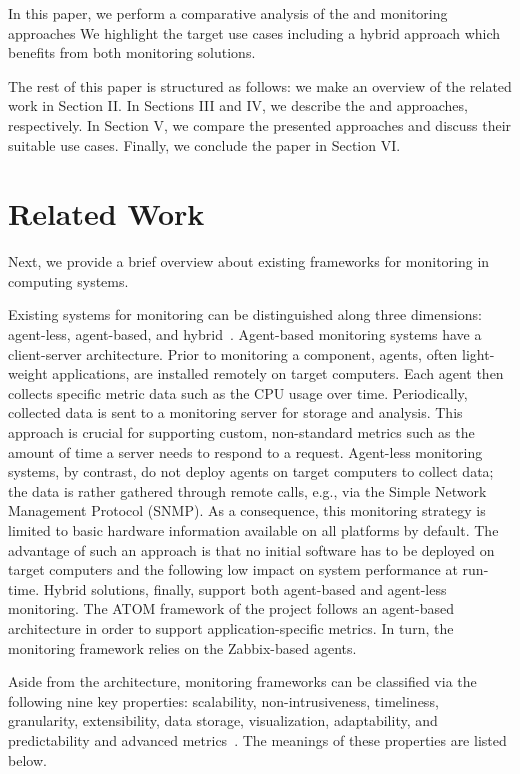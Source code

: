 \documentclass[10pt,letterpaper]{IEEEtran}
\begin{document}
In this paper, we perform a comparative analysis of the \ECO and \EXCESS monitoring approaches
We highlight the target use cases including a hybrid approach which benefits from both monitoring solutions.

The rest of this paper is structured as follows: we make an overview of the related work in Section II.
In Sections III and IV, we describe the \ECO and \EXCESS approaches, respectively.
In Section V, we compare the presented approaches and discuss their suitable use cases. Finally, we conclude the paper in Section VI.

\section{Related Work}
\label{sec:rw}

\noindent
Next, we provide a brief overview about existing frameworks for monitoring in computing systems.

Existing systems for monitoring can be distinguished along three dimensions: agent-less, agent-based, and hybrid~\cite{uptime14}.
Agent-based monitoring systems have a client-server architecture. Prior to monitoring a component, agents,
often light-weight applications, are installed remotely on target computers. Each agent then collects specific metric data
such as the CPU usage over time. Periodically, collected data is sent to a monitoring server for storage and analysis.
This approach is crucial for supporting custom, non-standard metrics such as the amount of time a server needs
to respond to a request. Agent-less monitoring systems, by contrast, do not deploy agents on target computers to collect
data; the data is rather gathered through remote calls, e.g., via the Simple Network Management Protocol (SNMP). As
a consequence, this monitoring strategy is limited to basic hardware information available on all platforms by default.
The advantage of such an approach is that no initial software has to be deployed on target computers and the following
low impact on system performance at run-time. Hybrid solutions, finally, support both agent-based and agent-less
monitoring. The ATOM framework of the \EXCESS project
follows an agent-based architecture in order to support application-specific metrics. In turn, the \ECO monitoring
framework relies on the Zabbix-based agents.

Aside from the architecture, monitoring frameworks can be classified via the following nine key properties: scalability,
non-intrusiveness, timeliness, granularity, extensibility, data storage, visualization, adaptability, and
predictability and advanced metrics~\cite{aceto13,katsaros11,telesca14}. The meanings of these properties are listed below.
\end{document}
